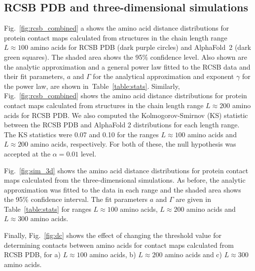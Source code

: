 \documentclass[notitlepage,
reprint,%
onecolumn,
amsmath,amssymb,superscriptaddress,aps,
pre,floatfix]{revtex4-1}
\begin{document}
\subsection{RCSB PDB and three-dimensional simulations}

Fig.~\ref{fig:rcsb_combined} a shows the amino acid distance distributions for protein contact maps calculated from structures in the chain length range $L\approx100$ amino acids for RCSB PDB (dark purple circles) and AlphaFold~2 (dark green squares). The shaded area shows the 95\% confidence level. Also shown are the analytic approximation and a general power law fitted to the RCSB data and their fit parameters, $a$ and $\Gamma$ for the analytical approximation and exponent $\gamma$ for the power law,  are shown in~Table~\ref{table:stats}. Similarly, Fig.~\ref{fig:rcsb_combined} shows the amino acid distance distributions for protein contact maps calculated from structures in the chain length range $L\approx200$ amino acids for RCSB PDB. We also computed the Kolmogorov-Smirnov (KS) statistic between the RCSB PDB and AlphaFold 2 distributions for each length range. The KS statistics were 0.07 and 0.10 for the ranges $L\approx100$ amino acids and $L\approx200$ amino acids, respectively. For both of these, the null hypothesis was accepted at the $\alpha=0.01$ level.

Fig.~\ref{fig:sim_3d} shows the amino acid distance distributions for protein contact maps calculated from the three-dimensional simulations. As before, the analytic approximation was fitted to the data in each range and the shaded area shows the 95\% confidence interval. The fit parameters $a$ and $\Gamma$ are given in Table~\ref{table:stats} for ranges $L\approx100$ amino acids,  $L\approx200$ amino acids and $L\approx300$ amino acids.

Finally, Fig.~\ref{fig:dc} shows the effect of changing the threshold value for determining contacts between amino acids for contact maps calculated from RCSB PDB, for a)  $L\approx100$ amino acids,  b) $L\approx200$ amino acids and c) $L\approx300$ amino acids.
\end{document}
